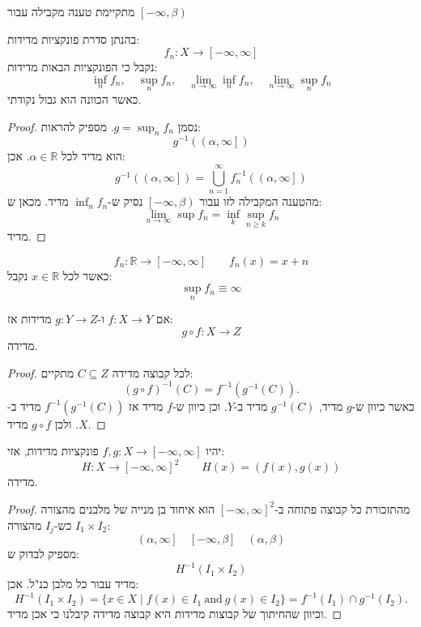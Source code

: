 \documentclass{tstextbook}
\begin{document}
\begin{remark}
מתקיימת טענה מקבילה עבור \(\left[ -\infty,\beta \right)\)

\end{remark}
\begin{corollary}
בהנתן סדרת פונקציות מדידות:
$$f_{n}:X\to \left[ -\infty,\infty \right]$$
נקבל כי הפונקציות הבאות מדידות:
$$\inf_{n}f_{n},\quad \sup _{n}f_{n}, \quad \lim_{ n \to \infty } \inf_{n}f_{n},\quad \lim_{ n \to \infty } \sup _{n}f_{n} $$
כאשר הכוונה הוא גבול נקודתי.

\end{corollary}
\begin{proof}
נסמן \(g=\sup_{n}f_{n}\). מספיק להראות:
$$g^{-1}\left( \left( \alpha,\infty \right] \right)$$
הוא מדיד לכל \(\alpha \in \mathbb{R}\). אכן:
$$g^{-1}\left( \left( \alpha,\infty \right] \right)= \bigcup_{n=1}^{\infty}f_{n}^{-1}\left( \left( \alpha,\infty \right] \right)$$
מהטענה המקבילה לזו עבור \(\left[ -\infty,\beta \right)\) נסיק ש-\(\inf_{n}f_{n}\) מדיד. מכאן ש:
$$\lim_{ n \to \infty } \sup f_{n}=\inf_{k} \sup _{n\geq k}f_{n}$$
מדיד.

\end{proof}
\begin{example}
$$f_{n}:\mathbb{R}\to \left[ -\infty,\infty \right]\qquad f_{n}(x)=x+n$$
כאשר לכל \(x \in \mathbb{R}\) נקבל:
$$\sup _{n}f_{n}\equiv \infty$$

\end{example}
\begin{lemma}
אם \(f:X\to Y\) ו-\(g:Y\to Z\) מדידות אז:
$$g\circ  f : X\to Z$$
מדידה.

\end{lemma}
\begin{proof}
לכל קבוצה מדידה \(C\subseteq Z\) מתקיים:
$$(g\circ f)^{-1}(C)=f^{-1}(g^{-1}(C)).$$
כאשר כיוון ש-\(g\) מדיד, \(g^{-1}(C)\) מדיד ב-\(Y\). וכן כיוון ש-\(f\) מדיד אז \(f^{-1}(g^{-1}(C))\) מדיד ב-\(X\). ולכן \(g\circ f\) מדיד.

\end{proof}
\begin{proposition}
יהיו \(f,g:X\to \left[ -\infty,\infty \right]\) פונקציות מדידות, אזי:
$$H:X\to\left[ -\infty,\infty \right]^{2}\qquad H(x)=(f(x),g(x))$$
מדידה.

\end{proposition}
\begin{proof}
מהתזכורת כל קבוצה פתוחה ב-\(\left[ -\infty ,\infty \right]^{2}\) הוא איחוד בן מנייה של מלבנים מהצורה \(I_{1}\times I_{2}\) כש-\(I_{j}\) מהצורה:
$$\left( \alpha,\infty \right]\quad \left[ -\infty,\beta \right]\quad \left( \alpha,\beta \right)$$
מספיק לבדוק ש:
$$H^{-1}\left( I_{1}\times I_{2} \right)$$
מדיד עבור כל מלבן כנ"ל. אכן:
$$H^{-1}(I_{1}\times I_{2})=\{x\in X\mid f(x)\in I_{1}{\mathrm{~and~}}g(x)\in I_{2}\}=f^{-1}(I_{1})\cap g^{-1}(I_{2}).$$
וכיוון שהחיתוך של קבוצות מדידות היא קבוצה מדידה קיבלנו כי אכן מדיד.

\end{proof}
\end{document}
